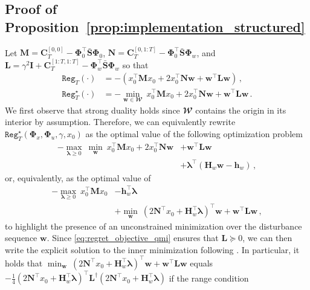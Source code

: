 \documentclass[conference]{IEEEtran}
\begin{document}
\subsection{Proof of Proposition~\ref{prop:implementation_structured}}
    Let $\mathbf{M} = \mathbf{C}_{T}^{[0, 0]} - \bm{\Phi}_0^\top \bar{\mathbf{S}} \bm{\Phi}_0$, $\mathbf{N} = \mathbf{C}_{T}^{[0, 1:T]} - \bm{\Phi}_0^\top \bar{\mathbf{S}} \bm{\Phi}_w$, and $\mathbf{L} = \gamma^2 \mathbf{I} + \mathbf{C}_{T}^{[1:T, 1:T]} - \bm{\Phi}_w^\top \bar{\mathbf{S}} \bm{\Phi}_w$ so that
    \begin{align*}
        \mathtt{Reg}_T(\cdot) &= -\left(x_0^\top \mathbf{M} x_0  + 2 x_0^\top \mathbf{N} \mathbf{w} + \mathbf{w}^\top \mathbf{L}
        \mathbf{w}\right)\,, \\
        \mathtt{Reg}_T^\star(\cdot) &=
        -\min_{\mathbf{w} \in \mathbfcal{W}} ~ x_0^\top \mathbf{M} x_0  + 2 x_0^\top \mathbf{N} \mathbf{w} + \mathbf{w}^\top \mathbf{L}
        \mathbf{w}\,.
    \end{align*}
    We first observe that strong duality holds since $\mathbfcal{W}$ contains the origin in its interior by assumption. Therefore, we can equivalently rewrite $\mathtt{Reg}_T^\star(\bm{\Phi}_x, \bm{\Phi}_u, \gamma, x_0)$ as the optimal value of the following optimization problem
    \begin{align*}
        - \max_{\bm{\lambda} \geq 0} ~ \min_{\mathbf{w}} ~  x_0^\top \mathbf{M} x_0 + 2x_0^\top \mathbf{N} \mathbf{w} &+ \mathbf{w}^\top \mathbf{L} \mathbf{w}\\
        &+ \bm{\lambda}^\top (\mathbf{H}_w \mathbf{w} - \mathbf{h}_w)\,,
    \end{align*}
    or, equivalently, as the optimal value of
    \begin{align*}
        - \max_{\bm{\lambda} \geq 0} ~ x_0^\top \mathbf{M} x_0 &- \mathbf{h}_w^\top \bm{\lambda}\\ &+ \min_{\mathbf{w}} ~  (2\mathbf{N}^\top x_0 + \mathbf{H}_w^\top \bm{\lambda})^\top \mathbf{w} + \mathbf{w}^\top \mathbf{L} \mathbf{w}\,,
    \end{align*}
    to highlight the presence of an unconstrained minimization over the disturbance sequence $\mathbf{w}$. Since \eqref{eq:regret_objective_qmi} ensures that $\mathbf{L} \succeq 0$, we can then write the explicit solution to the inner minimization following \cite[Sec. A.5.5]{boyd2004convex}. In particular, it holds that $\min_{\mathbf{w}} ~  (2\mathbf{N}^\top x_0 + \mathbf{H}_w^\top \bm{\lambda})^\top \mathbf{w} + \mathbf{w}^\top \mathbf{L} \mathbf{w}$ equals $-\frac{1}{4}  (2\mathbf{N}^\top x_0 + \mathbf{H}_w^\top \bm{\lambda})^\top \mathbf{L}^\dagger (2\mathbf{N}^\top x_0 + \mathbf{H}_w^\top \bm{\lambda})$ if the range condition
\end{document}
